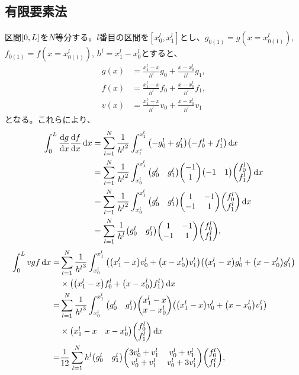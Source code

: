 \documentclass[xelatex,ja=standard]{bxjsarticle}
\begin{document}
\subsection{有限要素法}
区間$\qty[0,L]$を$N$等分する。$l$番目の区間を$[x^l_0,x^l_1]$とし、$g_{0(1)} = g(x=x^l_{0(1)})$, $f_{0(1)} = f(x=x^l_{0(1)})$, $h^l = x^l_1 - x^l_0$とすると、
\begin{align}
    g(x) &= \frac{x^l_1 - x}{h^l}g_0 + \frac{x-x^l_0}{h^l}g_1,\\
    f(x) &= \frac{x^l_1 - x}{h^l}f_0 + \frac{x-x^l_0}{h^l}f_1,\\
    v(x) &= \frac{x^l_1 - x}{h^l}v_0 + \frac{x-x^l_0}{h^l}v_1
\end{align}
となる。これらにより、
\begin{align}
    \int_0^L \dv{g}{x}\dv{f}{x}\dd{x} 
    &= \sum_{l=1}^N \frac{1}{{h^l}^2}\int_{x_l^e}^{x^l_1}\qty(-g^l_0 + g^l_1)\qty(-f^l_0 + f^l_1)\dd{x}\notag\\
    &= \sum_{l=1}^N \frac{1}{{h^l}^2}\int_{x^l_0}^{x^l_1}\mqty(g^l_0 & g^l_1)\mqty(-1\\1)\mqty(-1 & 1)\mqty(f^l_0 \\ f^l_1)\dd{x}\notag\\
    &= \sum_{l=1}^N \frac{1}{{h^l}^2}\int_{x^l_0}^{x^l_1}\mqty(g^l_0 & g^l_1)\mqty(1 & -1 \\ -1 & 1)\mqty(f^l_0 \\ f^l_1)\dd{x}\notag\\
    &= \sum_{l=1}^N \frac{1}{h^l}\mqty(g^l_0 & g^l_1)\mqty(1 & -1 \\ -1 & 1)\mqty(f^l_0 \\ f^l_1),
\end{align}
\begin{align}
    \int_0^L vgf\dd{x}
    =& \sum_{l=1}^N \frac{1}{{h^l}^3}\int_{x^l_0}^{x^l_1}
    \qty(\qty(x^l_1 - x)v^l_0 + \qty(x-x^l_0)v^l_1)
    \qty(\qty(x^l_1 - x)g^l_0 + \qty(x-x^l_0)g^l_1)\notag\\
    &\times\qty(\qty(x^l_1 - x)f^l_0 + \qty(x-x^l_0)f^l_1)
    \dd{x}\notag\\
    =& \sum_{l=1}^N \frac{1}{{h^l}^3}\int_{x^l_0}^{x^l_1}
    \mqty(g^l_0 & g^l_1) \mqty(x^l_1 - x \\ x-x^l_0)
    \qty(\qty(x^l_1 - x)v^l_0 + \qty(x-x^l_0)v^l_1)\notag\\
    &\times\mqty(x^l_1 - x & x-x^l_0)\mqty(f^l_0 \\ f^l_1)
    \dd{x}\notag\\
    =& \frac{1}{12}\sum_{l=1}^N h^l
    \mqty(g^l_0 & g^l_1) \mqty(3v_0^l +v_1^l & v_0^l +v_1^l\\ v_0^l +v_1^l&v_0^l +3v_1^l)\mqty(f^l_0 \\ f^l_1),
\end{align}
\end{document}

